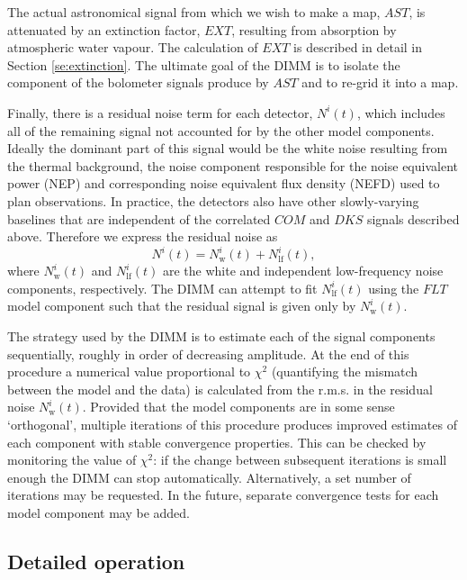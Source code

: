\documentclass[oneside,11pt]{starlink}
\begin{document}
The actual astronomical signal from which we wish to make a map,
$AST$, is attenuated by an extinction factor, $EXT$, resulting from
absorption by atmospheric water vapour. The calculation of $EXT$ is
described in detail in Section \ref{se:extinction}. The ultimate goal
of the DIMM is to isolate the component of the bolometer signals
produce by $AST$ and to re-grid it into a map.

Finally, there is a residual noise term for each detector, $N^i(t)$,
which includes all of the remaining signal not accounted for by the
other model components. Ideally the dominant part of this signal would
be the white noise resulting from the thermal background, the noise
component responsible for the noise equivalent power (NEP) and
corresponding noise equivalent flux density (NEFD) used to plan
observations. In practice, the detectors also have other
slowly-varying baselines that are independent of the correlated $COM$
and $DKS$ signals described above. Therefore we express the residual
noise as
%
\begin{equation}
N^{i}(t) = N^i_{\textrm{w}}(t) + N^i_{\textrm{lf}}(t),
\label{eq:dimm_noise}
\end{equation}
%
where $N^{i}_{\textrm{w}}(t)$ and $N^{i}_{\textrm{lf}}(t)$ are the white and
independent low-frequency noise components, respectively. The DIMM can
attempt to fit $N^{i}_{\textrm{lf}}(t)$ using the $FLT$ model component such
that the residual signal is given only by $N^{i}_{\textrm{w}}(t)$.

The strategy used by the DIMM is to estimate each of the signal
components sequentially, roughly in order of decreasing amplitude. At
the end of this procedure a numerical value proportional to $\chi^2$
(quantifying the mismatch between the model and the data) is
calculated from the r.m.s. in the residual noise $N^{i}_{\textrm{w}}(t)$. Provided that the model components are in some sense
`orthogonal', multiple iterations of this procedure produces improved
estimates of each component with stable convergence properties. This
can be checked by monitoring the value of $\chi^2$: if the change
between subsequent iterations is small enough the DIMM can stop
automatically. Alternatively, a set number of iterations may be
requested. In the future, separate convergence tests for each model
component may be added.

\subsection{Detailed operation\label{se:dimmdetails}}
\end{document}
